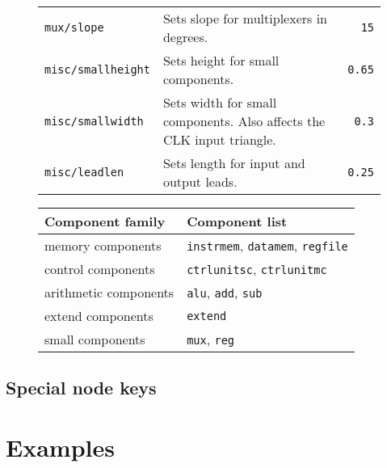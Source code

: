 \documentclass[.52pt,a4paper,titlepage]{article}
\begin{document}
\begin{figure}[htbp]
\begin{tabularx}{\textwidth}{|lXr|}
		\texttt{mux/slope}        & Sets slope for multiplexers in degrees.                               & \texttt{15}      \\
		\texttt{misc/smallheight} & Sets height for small components.                                     & \texttt{0.65}    \\
		\texttt{misc/smallwidth}  & Sets width for small components. Also affects the CLK input triangle. & \texttt{0.3}     \\
		\texttt{misc/leadlen}     & Sets length for input and output leads.                               & \texttt{0.25}    \\
		\hline
	\end{tabularx}
	\label{tab:keys}
\end{figure}

\begin{figure}[htbp]
	\begin{tabularx}{\textwidth}{|lX|}
		\hline
		Component family      & Component list                                        \\
		\hline
		memory components     & \texttt{instrmem}, \texttt{datamem}, \texttt{regfile} \\
		control components    & \texttt{ctrlunitsc}, \texttt{ctrlunitmc}              \\
		arithmetic components & \texttt{alu}, \texttt{add}, \texttt{sub}              \\
		extend components     & \texttt{extend}                                       \\
		small components      & \texttt{mux}, \texttt{reg}                            \\
		\hline
	\end{tabularx}
	\label{tab:families}
\end{figure}
\subsection{Special node keys}

\newpage
\section{Examples}
\end{document}
